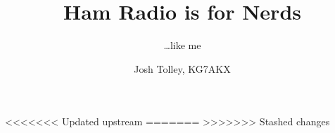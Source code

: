 



\title{Ham Radio is for Nerds}
\subtitle{\ldots like me}
\author{Josh Tolley, KG7AKX}

{
    \begin{frame} 
        \titlepage 
    \end{frame} 
} 

<<<<<<< Updated upstream
=======
>>>>>>> Stashed changes


